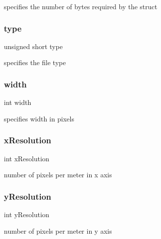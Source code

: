 specifies the number of bytes required by the struct 

\hypertarget{group___bitmap_gaa929142c5ddf34cf0915c97a617a1a63}{}\label{group___bitmap_gaa929142c5ddf34cf0915c97a617a1a63} 
\subsubsection{\texorpdfstring{type}{type}}
{\footnotesize\ttfamily unsigned short type}



specifies the file type 

\hypertarget{group___bitmap_ga2474a5474cbff19523a51eb1de01cda4}{}\label{group___bitmap_ga2474a5474cbff19523a51eb1de01cda4} 
\subsubsection{\texorpdfstring{width}{width}}
{\footnotesize\ttfamily int width}



specifies width in pixels 

\hypertarget{group___bitmap_gac6eaeb4c0876cf6cd899f41fe3c25ff5}{}\label{group___bitmap_gac6eaeb4c0876cf6cd899f41fe3c25ff5} 
\subsubsection{\texorpdfstring{x\+Resolution}{xResolution}}
{\footnotesize\ttfamily int x\+Resolution}



number of pixels per meter in x axis 

\hypertarget{group___bitmap_gaa2f350dd0bda750656d5db5f5e37b2b3}{}\label{group___bitmap_gaa2f350dd0bda750656d5db5f5e37b2b3} 
\subsubsection{\texorpdfstring{y\+Resolution}{yResolution}}
{\footnotesize\ttfamily int y\+Resolution}



number of pixels per meter in y axis 

